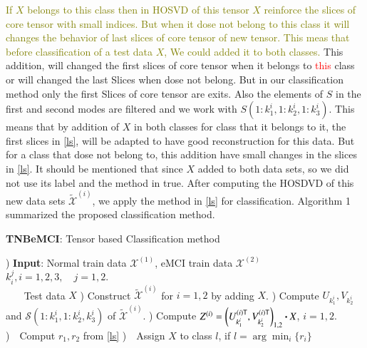 \documentclass[preprint,12pt]{elsarticle}
\begin{document}
\textcolor{olive}{If $X$ belongs to this class then in HOSVD of this tensor $X$ reinforce the slices of core tensor with small indices. But when it  dose not belong to this class  it  will changes the behavior of last slices of core tensor of new tensor. This meas that before classification of a test data $X$, We could added it to both classes.} This addition,  will changed the first slices of core tensor when it belongs to \textcolor{red}{this}  class or
will changed the last Slices  when dose not belong. But in our classification method only the first Slices of core tensor are exits. Also the elements of $S$ in the first and second modes are filtered and we work with $S(1:k_1^i,1:k_2^i,1:k_3^i)$.  This means that by addition of $X$ in both classes for class that it belongs to it, the first slices in \eqref{ls}, will be  adapted to have good reconstruction for this data. But for a class that dose not belong to, this addition have small changes in the slices in \eqref{ls}.
It should be mentioned that
since $X$ added to both data sets, so we did not use its label and the method in true. After computing the HOSDVD of this new data sets $\widetilde{\mathcal{X}}^{(i)}$, we apply the method in \eqref{ls} for classification.  Algorithm 1 summarized the proposed classification method.
\begin{algorithm}[h!]
	\label{ATNB}
	\caption{\textbf{TNBeMCI}: Tensor based Classification method}
	\begin{algorithmic}
		) \textbf{Input}: Normal train data $\mathcal{X}^{(1)}$, eMCI train data $\mathcal{X}^{(2)}$
		\STATE~~~    $k_i^j, i=1,2,3, \quad j=1,2$.\\
		\STATE~~~ Test data $X$
		) Construct $\widetilde{\mathcal{X}}^{(i)}$ for $i=1,2$ by adding $X$.
		) Compute $U_{k_1^i}, V_{k_2^i}$ and $\mathcal{S}(1:k_1^i,1:k_2^i,k_3^i)$ of  $\widetilde{\mathcal{X}}^{(i)}$.
		) Compute $Z^{(i)} = \left( U_{k_1^i}^{(i)\sf T}, V_{k_2^i}^{(i)\sf T} 
		\right)_{1,2}\boldsymbol{\cdot} X$, $i=1,2.$
		)~~Comput $r_1,r_2$ from \eqref{ls}
		 )~~Assign $X$ to class $l$, if $l= \arg \min_{i} \{r_i\}$
	\end{algorithmic}
\end{algorithm}
\end{document}
